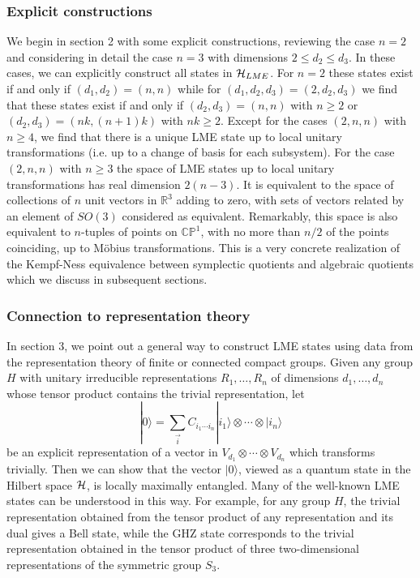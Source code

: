 \documentclass[12pt]{article}
\theoremstyle{definition}
\newcommand{\be}{\begin{equation}}
\newcommand{\ee}{\end{equation}}
\begin{document}
\subsubsection{Explicit constructions}

We begin in section 2 with some explicit constructions, reviewing the
case $n=2$ and considering in detail the case $n=3$ with dimensions $2
\le d_2 \le d_3$. In these cases, we can explicitly construct all
states in ${\cal H}_{LME}$. For $n=2$ these states exist if and only
if $(d_1,d_2) = (n,n)$ while for $(d_1, d_2, d_3) = (2,d_2,d_3)$ we
find that these states exist if and only if $(d_2,d_3) = (n,n)$ with
$n \ge 2$ or $(d_2,d_3) = (nk,(n+1)k)$ with $nk \ge 2$. Except for the
cases $(2,n,n)$ with $n \ge 4$, we find that there is a unique LME
state up to local unitary transformations (i.e. up to a change of
basis for each subsystem). For the case $(2,n,n)$ with $n \ge 3$ the
space of LME states up to local unitary transformations has real
dimension $2(n-3)$. It is equivalent to the space of collections of
$n$ unit vectors in $\mathbb{R}^3$ adding to zero, with sets of
vectors related by an element of $SO(3)$ considered as
equivalent. Remarkably, this space is also equivalent to $n$-tuples of
points on $\mathbb{CP}^{1}$, with no more than $n/2$ of the points
coinciding, up to M\"obius transformations. This is a very concrete
realization of the Kempf-Ness equivalence between symplectic quotients
and algebraic quotients which we discuss in subsequent sections.

\subsubsection{Connection to representation theory}

In section 3, we point out a general way to construct LME states using
data from the representation theory of finite or connected compact
groups. Given any group $H$ with unitary irreducible representations
$R_1,\dots ,R_n$ of dimensions $d_1, \dots, d_n$ whose tensor product
contains the trivial representation, let \be |0 \rangle =
\sum_{\vec{i}} C_{i_1 \cdots i_n} |i_1 \rangle \otimes \cdots \otimes
|i_n \rangle \ee be an explicit representation of a vector in $V_{d_1}
\otimes \cdots \otimes V_{d_n}$ which transforms trivially. Then we
can show that the vector $|0 \rangle$, viewed as a quantum state in
the Hilbert space ${\cal H}$, is locally maximally entangled. Many of
the well-known LME states can be understood in this way. For example,
for any group $H$, the trivial representation obtained from the tensor
product of any representation and its dual gives a Bell state, while
the GHZ state corresponds to the trivial representation obtained in
the tensor product of three two-dimensional representations of the
symmetric group $S_3$.
\end{document}
